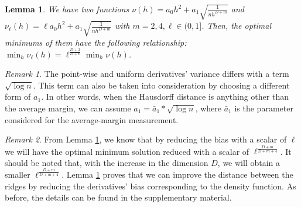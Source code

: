 \documentclass[aos,preprint]{imsart}
\newtheorem{lemma}[theorem]{Lemma}
\newtheorem{assumption}[theorem]{Assumption}
\theoremstyle{remark}
\newtheorem*{remark}{Remark}
\begin{document}
\begin{lemma}\label{improve_lemma}
We have two functions $\nu(h) = a_0 h^2 + a_1 \sqrt{\frac{1}{nh^{D+m}}}$ and $\nu_\ell (h) = \ell a_0 h^2 + a_1 \sqrt{\frac{1}{nh^{D+m}}}$ with $m=2,4,\ell \in(0,1]$. Then, the optimal minimums of them have the following relationship:  $\min_h \nu_\ell (h) = \ell^{\frac{D+2}{D+6}}\min_h \nu(h)$.%
\end{lemma} 
\begin{remark}
The point-wise and uniform derivatives' variance differs with a term $\sqrt{\log n}$. This term can also be taken into consideration by choosing a different form of $a_1$. In other words, when the Hausdorff distance is anything other than the average margin, we can assume $a_1=\bar{a}_1*\sqrt{\log n}$, where $\bar{a}_1$ is the parameter considered for the average-margin measurement.
\end{remark}
\begin{remark}
From Lemma \ref{improve_lemma}, we know that by reducing the bias with a scalar of $\ell$ we will have the optimal minimum solution reduced with a scalar of $\ell^{\frac{D+m}{D+m+4}}$. It should be noted that, with the increase in the dimension $D$, we will obtain a smaller $\ell^{\frac{D+m}{D+m+4}}$. Lemma \ref{improve_lemma} proves that we can improve the distance between the ridges by reducing the derivatives' bias corresponding to the density function. As before, the details can be found in the supplementary material.%
\end{remark}
\end{document}
